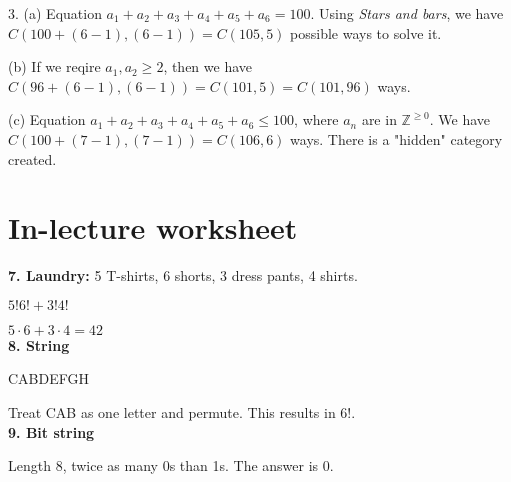 \documentclass[english]{exam}
\begin{document}
    3. (a) Equation $a_1 + a_2 + a_3 + a_4 + a_5 + a_6 = 100$. Using \textit{Stars and bars}, we have $C(100+(6-1), (6-1)) = C(105, 5)$ possible ways to solve it.
    
    (b) If we reqire $a_1, a_2 \geq 2$, then we have $C(96+(6-1), (6-1)) = C(101,5) = C(101, 96)$ ways.
    
    (c) Equation $a_1 + a_2 + a_3 + a_4 + a_5 + a_6 \leq 100$, where $a_n$ are in $\mathbb Z^{\geq 0}$. We have $C(100+(7-1), (7-1)) = C(106,6)$ ways. There is a "hidden" category created.\\
    
    \section{In-lecture worksheet}
    
    \textbf{7. Laundry:} 5 T-shirts, 6 shorts, 3 dress pants, 4 shirts.
    
    $5!6! + 3!4!$
    
    $5 \cdot 6 + 3 \cdot 4 = 42$\\
    
    \textbf{8. String}
    
    CABDEFGH
    
    Treat CAB as one letter and permute. This results in $6!$.\\
    
    \textbf{9. Bit string}
    
    Length 8, twice as many 0s than 1s. The answer is 0. 
    
    
    
\end{document}
